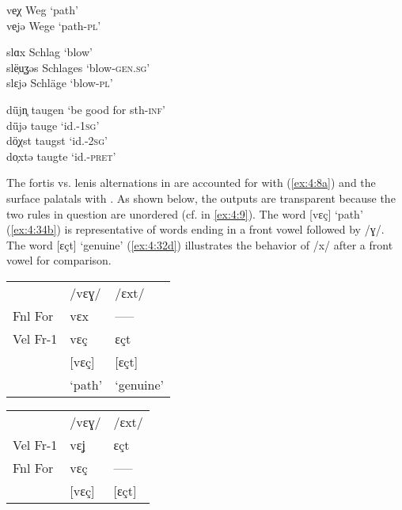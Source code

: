 \ex\label{ex:4:34b} ve̜χ  \tab [vɛç]  \tab Weg  \tab ‘path’  \\
    ve̜jə \tab [vɛʝə] \tab Wege \tab ‘path-\textsc{pl}’ 

\ex\label{ex:4:34c} slɑx      \tab  [slɑx]      \tab Schlag     \tab  ‘blow’  \\
    slë̜u̜ʓəs \tab    [slɛʊɣəs] \tab   Schlages \tab    ‘blow-\textsc{gen}.\textsc{sg}’ \\
    slɛjə     \tab  [slɛːʝə]    \tab Schläge    \tab   ‘blow-\textsc{pl}’ 
    
\ex\label{ex:4:34d}  dǖjn̥   \tab  [dyːʝn̩]\tab   taugen \tab    ‘be good for sth-\textsc{inf}’\\
     dǖjə    \tab [dyːʝə]  \tab tauge    \tab ‘id.-\textsc{1sg}’               \\
     dö̜χst  \tab  [dœçst] \tab  taugst  \tab   ‘id.-\textsc{2sg}’             \\
     do̜xtə  \tab  [dɔxtə] \tab  taugte  \tab   ‘id.-\textsc{pret}’            
    \z
\z 

The fortis vs. lenis alternations in  are accounted for with  (\ref{ex:4:8a}) and the surface palatals with . As shown below, the outputs are transparent because the two rules in question are unordered (cf.  in \ref{ex:4:9}). The word [vɛç] ‘path’ (\ref{ex:4:34b}) is representative of words ending in a front vowel followed by /ɣ/. The word [ɛçt] ‘genuine’ (\ref{ex:4:32d}) illustrates the behavior of /x/ after a front vowel for comparison.

\ea%
    \label{ex:4:35}
    \begin{multicols}{2}
\ea \begin{tabular}[t]{@{} lll @{}}  
         &  /vɛɣ/ &   /ɛxt/    \\
Fnl For  &  vɛx   &   -----    \\
Vel Fr-1 &  vɛç   &  ɛçt       \\   
         & [vɛç]  &  [ɛçt]     \\     
         & ‘path’ &   ‘genuine’\\
    \end{tabular}\label{ex:4:35a}
\ex \begin{tabular}[t]{@{} lll @{}}
           &  /vɛɣ/ & /ɛxt/\\
  Vel Fr-1 &  vɛʝ   & ɛçt  \\
   Fnl For &  vɛç   &  ----- \\
           & [vɛç]  & [ɛçt]\\
 \end{tabular}\label{ex:4:35b}
\z 
\end{multicols}
\z 

